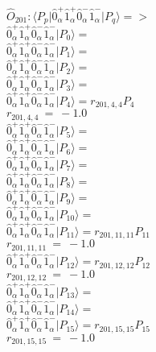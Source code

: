 \documentclass[14pt]{article}
\begin{document}
    $\hat{O}_{201}:  \langle{P_p}\vert \hat{0}_{\alpha}^{+}\hat{1}_{\alpha}^{+}\hat{0}_{\alpha}^{-}\hat{1}_{\alpha}^{-} \vert{P_q}\rangle => $ \\ 
    $ \hat{0}_{\alpha}^{+}\hat{1}_{\alpha}^{+}\hat{0}_{\alpha}^{-}\hat{1}_{\alpha}^{-} \vert{P_{0}}\rangle =  $ \\ 
    $ \hat{0}_{\alpha}^{+}\hat{1}_{\alpha}^{+}\hat{0}_{\alpha}^{-}\hat{1}_{\alpha}^{-} \vert{P_{1}}\rangle =  $ \\ 
    $ \hat{0}_{\alpha}^{+}\hat{1}_{\alpha}^{+}\hat{0}_{\alpha}^{-}\hat{1}_{\alpha}^{-} \vert{P_{2}}\rangle =  $ \\ 
    $ \hat{0}_{\alpha}^{+}\hat{1}_{\alpha}^{+}\hat{0}_{\alpha}^{-}\hat{1}_{\alpha}^{-} \vert{P_{3}}\rangle =  $ \\ 
    $ \hat{0}_{\alpha}^{+}\hat{1}_{\alpha}^{+}\hat{0}_{\alpha}^{-}\hat{1}_{\alpha}^{-} \vert{P_{4}}\rangle = {r}_{201,4,4}P_{4} $ \\ 
    ${r}_{201,4,4}\ =\ -1.0 $ \\ 
    $ \hat{0}_{\alpha}^{+}\hat{1}_{\alpha}^{+}\hat{0}_{\alpha}^{-}\hat{1}_{\alpha}^{-} \vert{P_{5}}\rangle =  $ \\ 
    $ \hat{0}_{\alpha}^{+}\hat{1}_{\alpha}^{+}\hat{0}_{\alpha}^{-}\hat{1}_{\alpha}^{-} \vert{P_{6}}\rangle =  $ \\ 
    $ \hat{0}_{\alpha}^{+}\hat{1}_{\alpha}^{+}\hat{0}_{\alpha}^{-}\hat{1}_{\alpha}^{-} \vert{P_{7}}\rangle =  $ \\ 
    $ \hat{0}_{\alpha}^{+}\hat{1}_{\alpha}^{+}\hat{0}_{\alpha}^{-}\hat{1}_{\alpha}^{-} \vert{P_{8}}\rangle =  $ \\ 
    $ \hat{0}_{\alpha}^{+}\hat{1}_{\alpha}^{+}\hat{0}_{\alpha}^{-}\hat{1}_{\alpha}^{-} \vert{P_{9}}\rangle =  $ \\ 
    $ \hat{0}_{\alpha}^{+}\hat{1}_{\alpha}^{+}\hat{0}_{\alpha}^{-}\hat{1}_{\alpha}^{-} \vert{P_{10}}\rangle =  $ \\ 
    $ \hat{0}_{\alpha}^{+}\hat{1}_{\alpha}^{+}\hat{0}_{\alpha}^{-}\hat{1}_{\alpha}^{-} \vert{P_{11}}\rangle = {r}_{201,11,11}P_{11} $ \\ 
    ${r}_{201,11,11}\ =\ -1.0 $ \\ 
    $ \hat{0}_{\alpha}^{+}\hat{1}_{\alpha}^{+}\hat{0}_{\alpha}^{-}\hat{1}_{\alpha}^{-} \vert{P_{12}}\rangle = {r}_{201,12,12}P_{12} $ \\ 
    ${r}_{201,12,12}\ =\ -1.0 $ \\ 
    $ \hat{0}_{\alpha}^{+}\hat{1}_{\alpha}^{+}\hat{0}_{\alpha}^{-}\hat{1}_{\alpha}^{-} \vert{P_{13}}\rangle =  $ \\ 
    $ \hat{0}_{\alpha}^{+}\hat{1}_{\alpha}^{+}\hat{0}_{\alpha}^{-}\hat{1}_{\alpha}^{-} \vert{P_{14}}\rangle =  $ \\ 
    $ \hat{0}_{\alpha}^{+}\hat{1}_{\alpha}^{+}\hat{0}_{\alpha}^{-}\hat{1}_{\alpha}^{-} \vert{P_{15}}\rangle = {r}_{201,15,15}P_{15} $ \\ 
    ${r}_{201,15,15}\ =\ -1.0 $ \\ 
    
\end{document}
